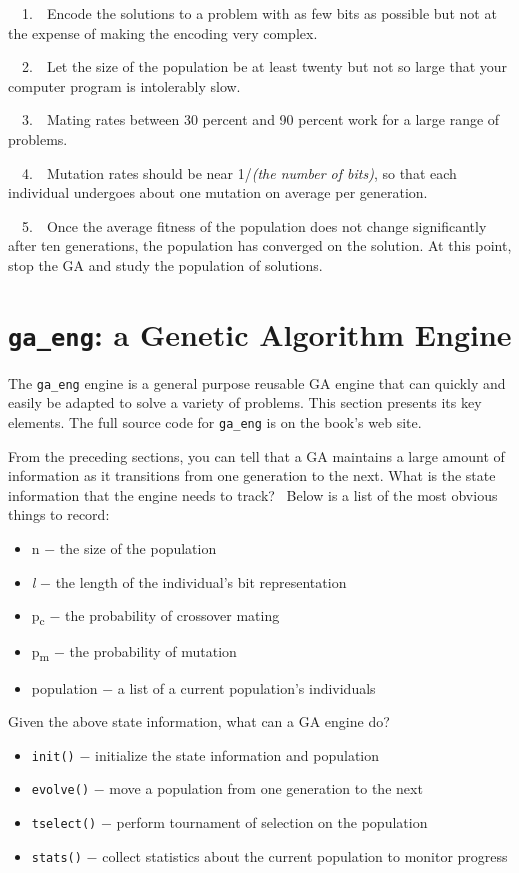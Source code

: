 \ \ 1.\ \ Encode the solutions to a problem with as few bits as possible
but not at the expense of making the encoding very complex.

\ \ 2.\ \ Let the size of the population be at least twenty but not so
large that your computer program is intolerably slow.

\ \ 3.\ \ Mating rates between 30 percent and 90 percent work for a
large range of problems.

\ \ 4.\ \ Mutation rates should be near 1/\textit{(the number of bits)},
so that each
individual undergoes about one mutation on average per generation.

\ \ 5.\ \ Once the average fitness of the population does not change
significantly after ten generations, the population has converged on
the solution. At this point, stop the GA and study the population of
solutions.


\section{\texttt{ga\_eng}: a Genetic Algorithm Engine}

The \texttt{ga\_eng} engine is a general purpose reusable GA engine that
can quickly and easily be adapted to solve a variety of problems. This
section presents its key elements. The full source
code for \texttt{ga\_eng} is on the book's web site.

From the preceding sections, you can tell that a GA maintains a large
amount of information as it transitions from one generation to the
next. What is the state information that the engine needs to track?
\ Below is a list of the most obvious things to record:

\begin{itemize}
\item n $-$ the size of the population
\item \textit{l} $-$ the length of the individual's bit
representation
\item p\textsubscript{c} $-$ the probability of crossover mating
\item p\textsubscript{m} $-$ the probability of mutation
\item population $-$ a list of a current population's
individuals
\end{itemize}
Given the above state information, what can a GA engine do?

\begin{itemize}
\item \texttt{init()} $-$ initialize the state information and
population
\item \texttt{evolve()} $-$ move a population from one generation to the
next
\item \texttt{tselect()} $-$ perform tournament of selection on the
population
\item \texttt{stats()} $-$ collect statistics about the current
population to monitor progress
\end{itemize}

